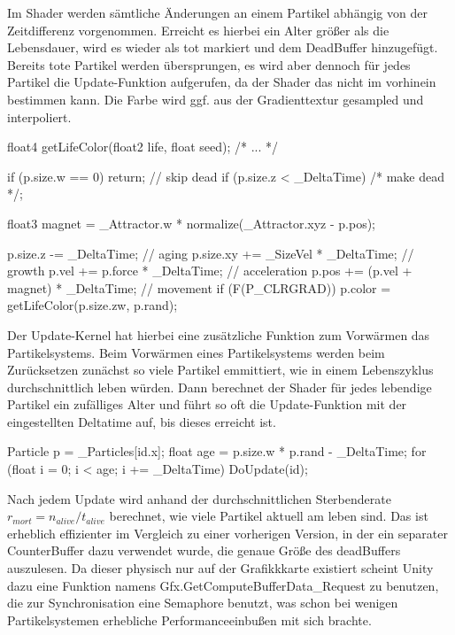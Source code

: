Im Shader werden sämtliche Änderungen an einem Partikel abhängig von der Zeitdifferenz vorgenommen. Erreicht es hierbei ein Alter grö{\ss}er als die Lebensdauer, wird es wieder als tot markiert und dem DeadBuffer hinzugefügt. Bereits tote Partikel werden übersprungen, es wird aber dennoch für jedes Partikel die Update-Funktion aufgerufen, da der Shader das nicht im vorhinein bestimmen kann. Die Farbe wird ggf. aus der Gradienttextur gesampled und interpoliert.

\begin{hlsl}[caption=Compute Update]
float4 getLifeColor(float2 life, float seed);
/* ... */

if (p.size.w == 0) return; // skip dead
if (p.size.z < _DeltaTime) /* make dead */;

float3 magnet = _Attractor.w * normalize(_Attractor.xyz - p.pos);

p.size.z -= _DeltaTime;             // aging
p.size.xy += _SizeVel * _DeltaTime; // growth
p.vel += p.force * _DeltaTime;      // acceleration
p.pos += (p.vel + magnet) * _DeltaTime; // movement
if (F(P_CLRGRAD)) p.color = getLifeColor(p.size.zw, p.rand);
\end{hlsl}

Der Update-Kernel hat hierbei eine zusätzliche Funktion zum Vorwärmen das Partikelsystems. Beim Vorwärmen eines Partikelsystems werden beim Zurücksetzen zunächst so viele Partikel emmittiert, wie in einem Lebenszyklus durchschnittlich leben würden. Dann berechnet der Shader für jedes lebendige Partikel ein zufälliges Alter und führt so oft die Update-Funktion mit der eingestellten Deltatime auf, bis dieses erreicht ist.

\begin{hlsl}[caption=Compute Prewarm Update Kernel]
Particle p = _Particles[id.x];
float age = p.size.w * p.rand - _DeltaTime;
for (float i = 0; i < age; i += _DeltaTime) DoUpdate(id);
\end{hlsl}

Nach jedem Update wird anhand der durchschnittlichen Sterbenderate $r_{mort} = n_{alive} / t_{alive}$ berechnet, wie viele Partikel aktuell am leben sind. Das ist erheblich effizienter im Vergleich zu einer vorherigen Version, in der ein separater CounterBuffer dazu verwendet wurde, die genaue Grö{\ss}e des deadBuffers auszulesen. Da dieser physisch nur auf der Grafikkkarte existiert scheint Unity dazu eine Funktion namens Gfx.GetComputeBufferData\_Request zu benutzen, die zur Synchronisation eine Semaphore benutzt, was schon bei wenigen Partikelsystemen erhebliche Performanceeinbu{\ss}en mit sich brachte.

